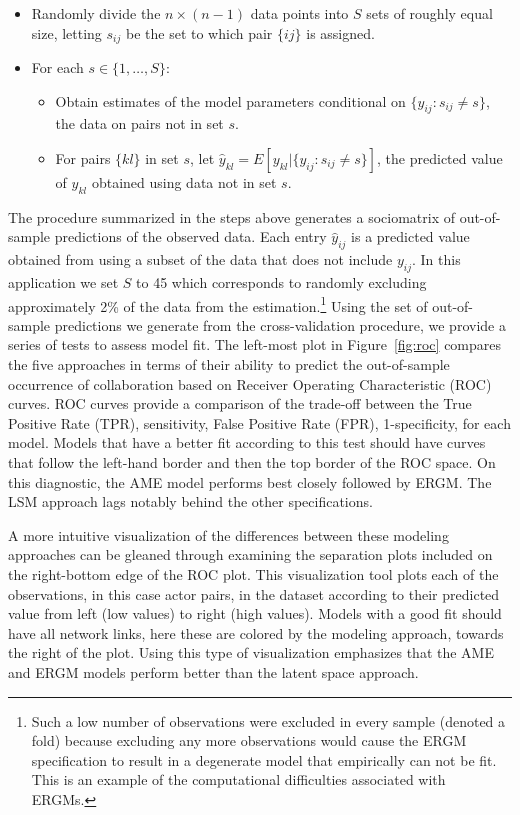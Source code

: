 \begin{itemize}
	\item Randomly divide the $n \times (n-1)$ data points into $S$ sets of roughly equal size, letting $s_{ij}$ be the set to which pair $\{ij\}$ is assigned.
	\item For each $s \in \{1, \ldots, S\}$:
	\begin{itemize}
		\item Obtain estimates of the model parameters conditional on $\{y_{ij} : s_{ij} \neq s\}$, the data on pairs not in set $s$.
		\item For pairs $\{kl\}$ in set $s$, let $\hat y_{kl} = E[y_{kl} | \{y_{ij} : s_{ij} \neq s\}]$, the predicted value of $y_{kl}$ obtained using data not in set $s$.
	\end{itemize}
\end{itemize}

The procedure summarized in the steps above generates a sociomatrix of out-of-sample predictions of the observed data. Each entry $\hat y_{ij}$ is a predicted value obtained from using a subset of the data that does not include $y_{ij}$. In this application we set $S$ to 45 which corresponds to randomly excluding approximately 2\% of the data from the estimation.\footnote{Such a low number of observations were excluded in every sample (denoted a fold) because excluding any more observations would cause the ERGM specification to result in a degenerate model that empirically can not be fit. This is an example of the computational difficulties associated with ERGMs.} Using the set of out-of-sample predictions we generate from the cross-validation procedure, we provide a series of tests to assess model fit. The left-most plot in Figure~\ref{fig:roc} compares the five approaches in terms of their ability to predict the out-of-sample occurrence of collaboration based on Receiver Operating Characteristic (ROC) curves. ROC curves provide a comparison of the trade-off between the True Positive Rate (TPR), sensitivity, False Positive Rate (FPR), 1-specificity, for each model. Models that have a better fit according to this test should have curves that follow the left-hand border and then the top border of the ROC space. On this diagnostic, the AME model performs best closely followed by ERGM. The LSM approach lags notably behind the other specifications. 

A more intuitive visualization of the differences between these modeling approaches can be gleaned through examining the separation plots included on the right-bottom edge of the ROC plot. This visualization tool plots each of the observations, in this case actor pairs, in the dataset according to their predicted value from left (low values) to right (high values). Models with a good fit should have all network links, here these are colored by the modeling approach, towards the right of the plot. Using this type of visualization emphasizes that the AME and ERGM models perform better than the latent space approach.

